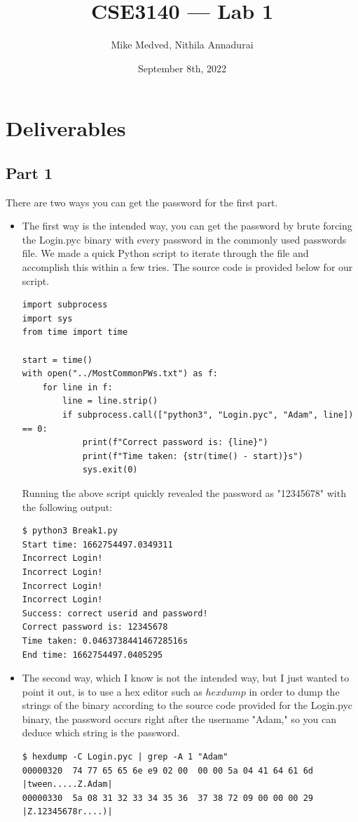 \documentclass{article}
\title{CSE3140 — Lab 1}
\author{Mike Medved, Nithila Annadurai}
\date{September 8th, 2022}
\begin{document}
\maketitle

\section*{Deliverables}

\subsection*{Part 1}

There are two ways you can get the password for the first part.

\begin{itemize}
    \item The first way is the intended way, you can get the password by brute forcing the Login.pyc binary with every password in the commonly used passwords file. We made a quick Python script to iterate through the file and accomplish this within a few tries. The source code is provided below for our script.
    
\begin{verbatim}
import subprocess
import sys
from time import time

start = time()
with open("../MostCommonPWs.txt") as f:
    for line in f:
        line = line.strip()
        if subprocess.call(["python3", "Login.pyc", "Adam", line]) == 0:
            print(f"Correct password is: {line}")
            print(f"Time taken: {str(time() - start)}s")
            sys.exit(0)
    \end{verbatim}

    Running the above script quickly revealed the password as "12345678" with the following output:
    \begin{verbatim}
$ python3 Break1.py 
Start time: 1662754497.0349311
Incorrect Login!
Incorrect Login!
Incorrect Login!
Incorrect Login!
Success: correct userid and password!
Correct password is: 12345678
Time taken: 0.046373844146728516s
End time: 1662754497.0405295
\end{verbatim}

    \item The second way, which I know is not the intended way, but I just wanted to point it out, is to use a hex editor such as $hexdump$ in order to dump the strings of the binary according to the source code provided for the Login.pyc binary, the password occurs right after the username "Adam," so you can deduce which string is the password.
    
    \begin{verbatim}
$ hexdump -C Login.pyc | grep -A 1 "Adam"
00000320  74 77 65 65 6e e9 02 00  00 00 5a 04 41 64 61 6d  |tween.....Z.Adam|
00000330  5a 08 31 32 33 34 35 36  37 38 72 09 00 00 00 29  |Z.12345678r....)|
    \end{verbatim}
\end{itemize}
\end{document}
